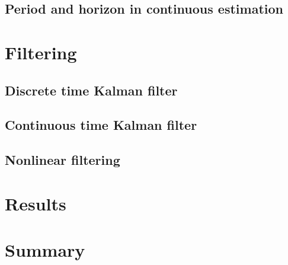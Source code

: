 \subsection{Period and horizon in continuous estimation}


\section{Filtering}

\subsection{Discrete time Kalman filter}

\subsection{Continuous time Kalman filter}

\subsection{Nonlinear filtering}


\section{Results}


\section{Summary}


